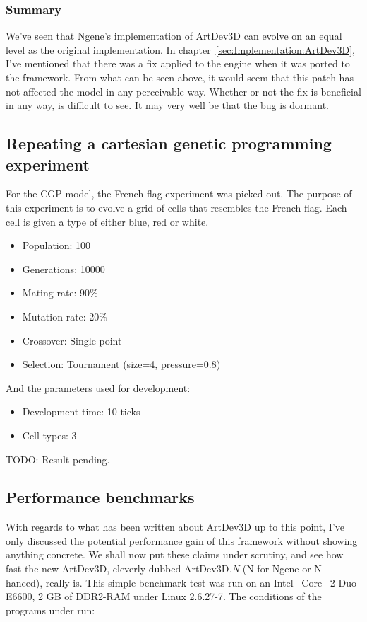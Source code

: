 \subsubsection{Summary}
We've seen that Ngene's implementation of ArtDev3D can evolve on an equal level as the original implementation. In chapter~\ref{sec:Implementation:ArtDev3D}, I've mentioned that there was a fix applied to the engine when it was ported to the framework. From what can be seen above, it would seem that this patch has not affected the model in any perceivable way. Whether or not the fix is beneficial in any way, is difficult to see. It may very well be that the bug is dormant.


\subsection{Repeating a cartesian genetic programming experiment}
For the CGP model, the French flag experiment was picked out. The purpose of this experiment is to evolve a grid of cells that resembles the French flag. Each cell is given a type of either blue, red or white.

\begin{itemize}
	\itemsep=-2pt
	\item Population: 100
	\item Generations: 10000
	\item Mating rate: 90\%
	\item Mutation rate: 20\%
	\item Crossover: Single point
	\item Selection: Tournament (size=4, pressure=0.8)
\end{itemize}

And the parameters used for development:

\begin{itemize}
	\itemsep=-2pt
	\item Development time: 10 ticks
	\item Cell types: 3
\end{itemize}

TODO: Result pending.


\subsection{Performance benchmarks}
With regards to what has been written about ArtDev3D up to this point, I've only discussed the potential performance gain of this framework without showing anything concrete. We shall now put these claims under scrutiny, and see how fast the new ArtDev3D, cleverly dubbed ArtDev3D\emph{.N} (N for Ngene or N-hanced), really is. This simple benchmark test was run on an Intel\textregistered~ Core\texttrademark~ 2 Duo E6600, 2 GB of DDR2-RAM under Linux 2.6.27-7. The conditions of the programs under run:

